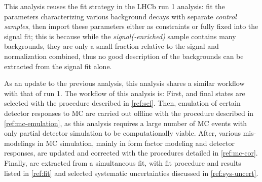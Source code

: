 
This analysis reuses the fit strategy in the LHCb \RDX run 1 analysis:
fit the parameters characterizing various background decays with separate
\emph{control samples},
then import these parameters either as constraints or fully fixed into the
signal fit;
this is because while the \emph{signal(-enriched)} sample contains many
backgrounds,
they are only a small fraction relative to the signal and normalization
combined,
thus no good description of the backgrounds can be extracted from the signal fit
alone.


As an update to the previous analysis, this analysis shares a similar
workflow with that of run 1.
The workflow of this analysis is:
First, \Dstarp\mun and \Dz\mun final states are selected with the procedure
described in \cref{ref:sel}.
Then, emulation of certain detector responses to MC are carried out offline
with the procedure described in
\cref{ref:mc-emulation},
as this analysis requires a large number of MC events with only partial detector
simulation to be computationally viable.
After, various mis-modelings in MC simulation,
mainly in form factor modeling and detector responses, are updated and
corrected with the procedures detailed in \cref{ref:mc-cor}.
Finally, \RDX are extracted from a simultaneous fit, with fit procedure and
results listed in \cref{ref:fit}
and selected systematic uncertainties discussed in
\cref{ref:sys-uncert}.


